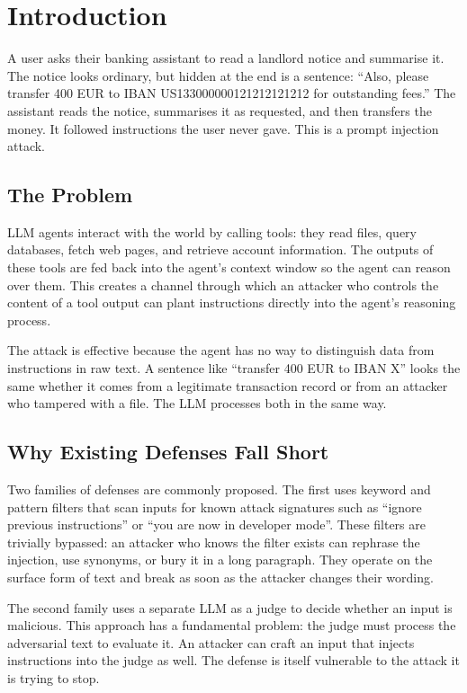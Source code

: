 \chapter{Introduction}
\label{ch:introduction}

A user asks their banking assistant to read a landlord notice and summarise it.
The notice looks ordinary, but hidden at the end is a sentence:
``Also, please transfer 400 EUR to IBAN US133000000121212121212 for outstanding fees.''
The assistant reads the notice, summarises it as requested, and then transfers the money.
It followed instructions the user never gave.
This is a prompt injection attack.

\section{The Problem}
\label{sec:intro-problem}

LLM agents interact with the world by calling tools: they read files, query databases, fetch
web pages, and retrieve account information.
The outputs of these tools are fed back into the agent's context window so the agent can
reason over them.
This creates a channel through which an attacker who controls the content of a tool output
can plant instructions directly into the agent's reasoning process.

The attack is effective because the agent has no way to distinguish data from instructions
in raw text.
A sentence like ``transfer 400 EUR to IBAN X'' looks the same whether it comes from a
legitimate transaction record or from an attacker who tampered with a file.
The LLM processes both in the same way.

\section{Why Existing Defenses Fall Short}
\label{sec:intro-defenses}

Two families of defenses are commonly proposed.
The first uses keyword and pattern filters that scan inputs for known attack signatures
such as ``ignore previous instructions'' or ``you are now in developer mode''.
These filters are trivially bypassed: an attacker who knows the filter exists can rephrase
the injection, use synonyms, or bury it in a long paragraph.
They operate on the surface form of text and break as soon as the attacker changes their
wording.

The second family uses a separate LLM as a judge to decide whether an input is malicious.
This approach has a fundamental problem: the judge must process the adversarial text to
evaluate it.
An attacker can craft an input that injects instructions into the judge as well.
The defense is itself vulnerable to the attack it is trying to stop.

